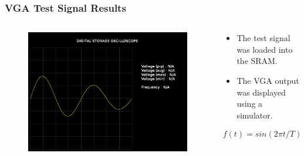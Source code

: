 \documentclass{beamer}
\begin{document}
\begin{frame}
\frametitle{VGA Test Signal Results}

\begin{columns}[onlytextwidth]
  \begin{column}{0.5\linewidth}
  
    \begin{figure}[!htb]
      \includegraphics[width=\linewidth]{vga_test_signal1_results.png}
    \end{figure}
    
  \end{column}
  \begin{column}{0.45\linewidth}
  
    \begin{itemize}
      \item The test signal was loaded into the SRAM.
      \item The VGA output was displayed using a simulator.
    \end{itemize}
    
    \[ f(t) = sin( {2 \pi t}/{T} ) e^{{-t}/{2 T}} \]
    
  \end{column}
\end{columns}

\end{frame}
\end{document}

